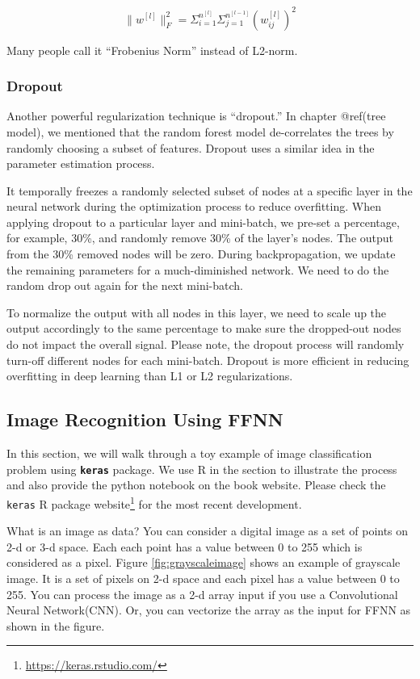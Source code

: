 \documentclass[
  12pt,
]{krantz}
\renewcommand{\href}[2]{#2\footnote{\url{#1}}}
\begin{document}
\[\parallel w^{[l]} \parallel^2_F = \Sigma_{i=1}^{n^{[l]}}\Sigma_{j=1}^{n^{[l-1]}} (w^{[l]}_{ij})^2\]

Many people call it ``Frobenius Norm'' instead of L2-norm.

\hypertarget{dropout}{%
\subsubsection{Dropout}\label{dropout}}

Another powerful regularization technique is ``dropout.'' In chapter @ref(tree model), we mentioned that the random forest model de-correlates the trees by randomly choosing a subset of features. Dropout uses a similar idea in the parameter estimation process.

It temporally freezes a randomly selected subset of nodes at a specific layer in the neural network during the optimization process to reduce overfitting. When applying dropout to a particular layer and mini-batch, we pre-set a percentage, for example, 30\%, and randomly remove 30\% of the layer's nodes. The output from the 30\% removed nodes will be zero. During backpropagation, we update the remaining parameters for a much-diminished network. We need to do the random drop out again for the next mini-batch.

To normalize the output with all nodes in this layer, we need to scale up the output accordingly to the same percentage to make sure the dropped-out nodes do not impact the overall signal. Please note, the dropout process will randomly turn-off different nodes for each mini-batch. Dropout is more efficient in reducing overfitting in deep learning than L1 or L2 regularizations.

\hypertarget{ffnnexample}{%
\subsection{Image Recognition Using FFNN}\label{ffnnexample}}

In this section, we will walk through a toy example of image classification problem using \textbf{\texttt{keras}} package. We use R in the section to illustrate the process and also provide the python notebook on the book website. Please check the \href{https://keras.rstudio.com/}{\texttt{keras} R package website} for the most recent development.

What is an image as data? You can consider a digital image as a set of points on 2-d or 3-d space. Each each point has a value between 0 to 255 which is considered as a pixel. Figure \ref{fig:grayscaleimage} shows an example of grayscale image. It is a set of pixels on 2-d space and each pixel has a value between 0 to 255. You can process the image as a 2-d array input if you use a Convolutional Neural Network(CNN). Or, you can vectorize the array as the input for FFNN as shown in the figure.
\end{document}
